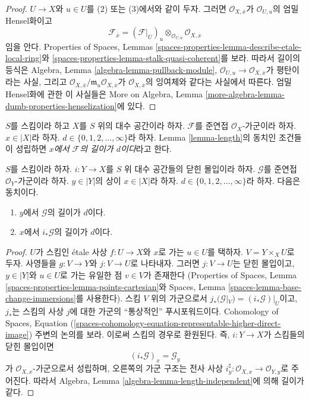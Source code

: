 \begin{proof}
$U \to X$와 $u \in U$를 (2) 또는 (3)에서와 같이 두자. 그러면
$\mathcal{O}_{X, \overline{x}}$가 $\mathcal{O}_{U, u}$의 엄밀 Hensel화이고
$$
\mathcal{F}_{\overline{x}} =
(\mathcal{F}|_U)_u \otimes_{\mathcal{O}_{U, u}} \mathcal{O}_{X, \overline{x}}
$$
임을 안다. Properties of Spaces, Lemmas
\ref{spaces-properties-lemma-describe-etale-local-ring}와
\ref{spaces-properties-lemma-stalk-quasi-coherent}를 보라.
따라서 길이의 등식은 Algebra, Lemma
\ref{algebra-lemma-pullback-module},
$\mathcal{O}_{U, u} \to \mathcal{O}_{X, \overline{x}}$가 평탄이라는 사실,
그리고
$\mathcal{O}_{X, \overline{x}}/\mathfrak m_u\mathcal{O}_{X, \overline{x}}$가
$\mathcal{O}_{X, \overline{x}}$의 잉여체와 같다는 사실에서 따른다.
엄밀 Hensel화에 관한 이 사실들은 More on Algebra, Lemma
\ref{more-algebra-lemma-dumb-properties-henselization}에 있다.
\end{proof}

\begin{definition}
\label{definition-length-at-x}
$S$를 스킴이라 하고 $X$를 $S$ 위의 대수 공간이라 하자.
$\mathcal{F}$를 준연접 $\mathcal{O}_X$-가군이라 하자.
$x \in |X|$라 하자. $d \in \{0, 1, 2, \ldots, \infty\}$라 하자.
Lemma \ref{lemma-length}의 동치인 조건들이 성립하면
{\it $x$에서 $\mathcal{F}$의 길이가 $d$이다}라고 한다.
\end{definition}

\begin{lemma}
\label{lemma-length-closed-immersion}
$S$를 스킴이라 하자. $i : Y \to X$를 $S$ 위 대수 공간들의 닫힌
몰입이라 하자. $\mathcal{G}$를 준연접 $\mathcal{O}_Y$-가군이라 하자.
$y \in |Y|$의 상이 $x \in |X|$라 하자.
$d \in \{0, 1, 2, \ldots, \infty\}$라 하자. 다음은 동치이다.
\begin{enumerate}
\item $y$에서 $\mathcal{G}$의 길이가 $d$이다.
\item $x$에서 $i_*\mathcal{G}$의 길이가 $d$이다.
\end{enumerate}
\end{lemma}

\begin{proof}
$U$가 스킴인 \'etale 사상 $f : U \to X$와 $x$로 가는 $u \in U$를
택하자. $V = Y \times_X U$로 두자. 사영들을 $g : V \to Y$와
$j : V \to U$로 나타내자. 그러면 $j : V \to U$는 닫힌 몰입이고,
$y \in |Y|$와 $u \in U$로 가는 유일한 점 $v \in V$가 존재한다
(Properties of Spaces, Lemma
\ref{spaces-properties-lemma-points-cartesian}와 Spaces, Lemma
\ref{spaces-lemma-base-change-immersions}를 사용한다).
스킴 $V$ 위의 가군으로서
$j_*(\mathcal{G}|_V) = (i_*\mathcal{G})|_U$이고, $j_*$는 스킴의 사상
$j$에 대한 가군의 ``통상적인'' 푸시포워드이다. Cohomology of Spaces,
Equation
(\ref{spaces-cohomology-equation-representable-higher-direct-image})
주변의 논의를 보라. 이로써 스킴의 경우로 환원된다. 즉,
$i : Y \to X$가 스킴들의 닫힌 몰입이면
$$
(i_*\mathcal{G})_x = \mathcal{G}_y
$$
가 $\mathcal{O}_{X, x}$-가군으로서 성립하며, 오른쪽의 가군 구조는
전사 사상 $i_y^\sharp : \mathcal{O}_{X, x} \to \mathcal{O}_{Y, y}$로
주어진다. 따라서 Algebra, Lemma
\ref{algebra-lemma-length-independent}에 의해 길이가 같다.
\end{proof}

